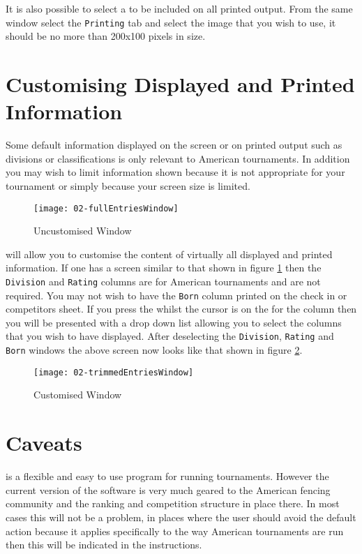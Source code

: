 \documentclass[a4paper,11pt]{memoir}
\begin{document}
It is also possible to select a  to be included on all printed output. From the same window select the \texttt{Printing} tab and select the image that you wish to use, it should be no more than 200x100 pixels in size.

\section{Customising Displayed and Printed Information}
Some default information displayed on the screen or on printed output such as divisions or classifications is only relevant to American tournaments. In addition you may wish to limit information shown because it is not appropriate for your tournament or simply because your screen size is limited.

\begin{figure}[!ht]
 \centering
 \texttt{[image: 02-fullEntriesWindow]}
 \caption{Uncustomised Window} \label{fig:02-uncustomisedWindow}
\end{figure}

\fencingtime{} will allow you to customise the content of virtually all displayed and printed information. If one has a screen similar to that shown in figure \ref{fig:02-uncustomisedWindow} then the \texttt{Division} and \texttt{Rating} columns are for American tournaments and are not required. You may not wish to have the \texttt{Born} column printed on the check in or competitors sheet. If you press the  whilst the cursor is on the  for the column then you will be presented with a drop down list allowing you to select the columns that you wish to have displayed. After deselecting the \texttt{Division}, \texttt{Rating} and \texttt{Born} windows the above screen now looks like that shown in figure \ref{fig:02-customisedWindow}.

\begin{figure}[!ht]
 \centering
 \texttt{[image: 02-trimmedEntriesWindow]}
 \caption{Customised Window} \label{fig:02-customisedWindow}
\end{figure}

\section{Caveats}
\fencingtime{} is a flexible and easy to use program for running tournaments. However the current version of the software is very much geared to the American fencing community and the \gls{ranking} and \gls{competition} structure in place there. In most cases this will not be a problem, in places where the user should avoid the default action because it applies specifically to the way American tournaments are run then this will be indicated in the instructions.
\end{document}
